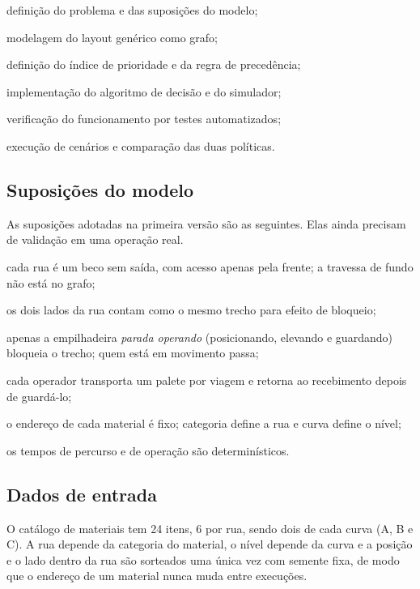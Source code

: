 \documentclass[
	article,
	11pt,
	oneside,
	a4paper,
	english,
	brazil,
	sumario=tradicional
	]{abntex2}
\begin{document}
\begin{alineas}
	\item definição do problema e das suposições do modelo;
	\item modelagem do layout genérico como grafo;
	\item definição do índice de prioridade e da regra de precedência;
	\item implementação do algoritmo de decisão e do simulador;
	\item verificação do funcionamento por testes automatizados;
	\item execução de cenários e comparação das duas políticas.
\end{alineas}

\subsection{Suposições do modelo}

As suposições adotadas na primeira versão são as seguintes. Elas ainda precisam
de validação em uma operação real.

\begin{alineas}
	\item cada rua é um beco sem saída, com acesso apenas pela frente; a travessa
	de fundo não está no grafo;
	\item os dois lados da rua contam como o mesmo trecho para efeito de
	bloqueio;
	\item apenas a empilhadeira \emph{parada operando} (posicionando, elevando e
	guardando) bloqueia o trecho; quem está em movimento passa;
	\item cada operador transporta um palete por viagem e retorna ao recebimento
	depois de guardá-lo;
	\item o endereço de cada material é fixo; categoria define a rua e curva
	define o nível;
	\item os tempos de percurso e de operação são determinísticos.
\end{alineas}

\subsection{Dados de entrada}

O catálogo de materiais tem 24 itens, 6 por rua, sendo dois de cada curva (A, B
e C). A rua depende da categoria do material, o nível depende da curva e a
posição e o lado dentro da rua são sorteados uma única vez com semente fixa,
de modo que o endereço de um material nunca muda entre execuções.
\end{document}
